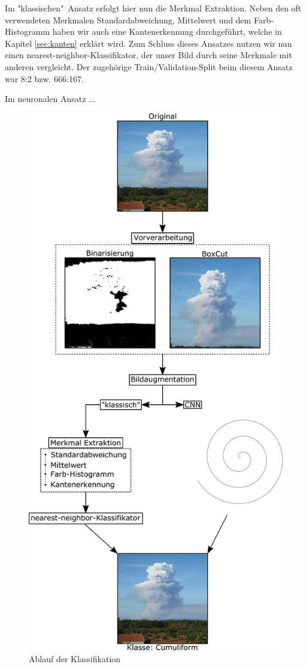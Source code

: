 \documentclass[a4,german]{article}
\begin{document}
Im "klassischen"\ Ansatz erfolgt hier nun die Merkmal Extraktion.
Neben den oft verwendeten Merkmalen Standardabweichung, Mittelwert und dem Farb-Histogramm haben wir auch eine Kantenerkennung durchgeführt, welche in Kapitel \ref{sec:kanten} erklärt wird.
Zum Schluss dieses Ansatzes nutzen wir nun einen nearest-neighbor-Klassifikator, der unser Bild durch seine Merkmale mit anderen vergleicht.
Der zugehörige Train/Validation-Split beim diesem Ansatz war 8:2 bzw. 666:167.

Im neuronalen Ansatz ...

\begin{figure}
	\centering
	\includegraphics[width=0.8\linewidth,height=0.68\paperheight]{Ablauf.pdf}
	\caption{Ablauf der Klassifikation}
	\label{fig:ablauf}
\end{figure}
\end{document}
